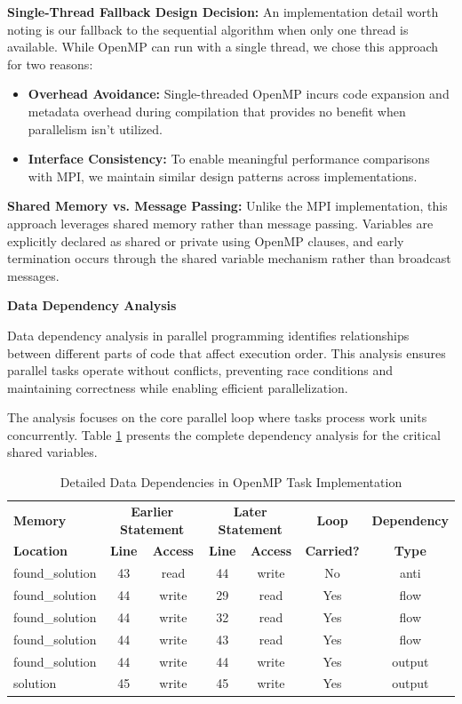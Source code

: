 \textbf{Single-Thread Fallback Design Decision:}
An implementation detail worth noting is our fallback to the sequential algorithm when only one thread is available. While OpenMP can run with a single thread, we chose this approach for two reasons:
\begin{itemize}
    \item \textbf{Overhead Avoidance:} Single-threaded OpenMP incurs code expansion and metadata overhead during compilation that provides no benefit when parallelism isn't utilized.
    \item \textbf{Interface Consistency:} To enable meaningful performance comparisons with MPI, we maintain similar design patterns across implementations.
\end{itemize}

\textbf{Shared Memory vs. Message Passing:}
Unlike the MPI implementation, this approach leverages shared memory rather than message passing. Variables are explicitly declared as shared or private using OpenMP clauses, and early termination occurs through the shared variable mechanism rather than broadcast messages.

\textbf{Data Dependency Analysis}

Data dependency analysis in parallel programming identifies relationships between different parts of code that affect execution order. This analysis ensures parallel tasks operate without conflicts, preventing race conditions and maintaining correctness while enabling efficient parallelization.

The analysis focuses on the core parallel loop where tasks process work units concurrently. Table \ref{tab:omp_dependencies_detailed} presents the complete dependency analysis for the critical shared variables.

\begin{table}[htbp]
\caption{Detailed Data Dependencies in OpenMP Task Implementation}
\begin{center}
\small
\begin{tabular}{@{}lcccccc@{}}
\toprule
\textbf{Memory} & \multicolumn{2}{c}{\textbf{Earlier Statement}} & \multicolumn{2}{c}{\textbf{Later Statement}} & \textbf{Loop} & \textbf{Dependency} \\
\textbf{Location} & \textbf{Line} & \textbf{Access} & \textbf{Line} & \textbf{Access} & \textbf{Carried?} & \textbf{Type} \\
\midrule
found\_solution & 43 & read & 44 & write & No & anti \\
found\_solution & 44 & write & 29 & read & Yes & flow \\
found\_solution & 44 & write & 32 & read & Yes & flow \\
found\_solution & 44 & write & 43 & read & Yes & flow \\
found\_solution & 44 & write & 44 & write & Yes & output \\
solution & 45 & write & 45 & write & Yes & output \\
\bottomrule
\end{tabular}
\end{center}
\label{tab:omp_dependencies_detailed}
\end{table}

